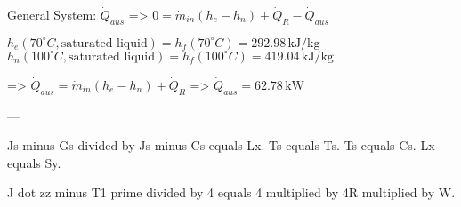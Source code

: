 General System: \( \dot{Q}_{aus} \)  
=> \( 0 = \dot{m}_{in}(h_e - h_n) + \dot{Q}_R - \dot{Q}_{aus} \)  

\( h_e(70^\circ C, \text{saturated liquid}) = h_f(70^\circ C) = 292.98 \, \text{kJ/kg} \)  
\( h_n(100^\circ C, \text{saturated liquid}) = h_f(100^\circ C) = 419.04 \, \text{kJ/kg} \)  

=> \( \dot{Q}_{aus} = \dot{m}_{in}(h_e - h_n) + \dot{Q}_R \)  
=> \( \dot{Q}_{aus} = 62.78 \, \text{kW} \)  

---

Js minus Gs divided by Js minus Cs equals Lx.  
Ts equals Ts.  
Ts equals Cs.  
Lx equals Sy.  

J dot zz minus T1 prime divided by 4 equals 4 multiplied by 4R multiplied by W.